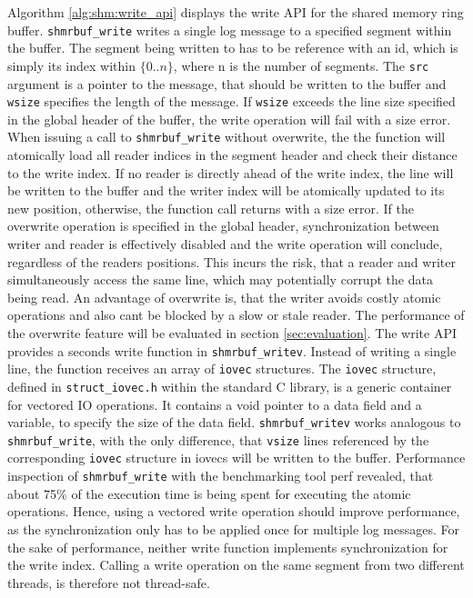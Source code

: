 Algorithm \ref{alg:shm:write_api} displays the write API for the shared memory ring buffer. \texttt{shmrbuf\_write}
writes a single log message to a specified segment within the buffer. The segment being written to has to be reference with an id, which is simply its index within $\{0..n\}$, where
n is the number of segments. The \texttt{src} argument is a pointer to the message, that should be written to the buffer and \texttt{wsize} specifies the length of the message.
If \texttt{wsize} exceeds the line size specified in the global header of the buffer, the write operation will fail with a size error. When issuing a call to \texttt{shmrbuf\_write} without overwrite, the 
the function will atomically load all reader indices in the segment header and check their distance to the write index. If no reader is directly ahead of the write index, the line will be written
to the buffer and the writer index will be atomically updated to its new position, otherwise, the function call returns with a size error. If the overwrite operation is specified in the global header, synchronization between writer and reader is
effectively disabled and the write operation will conclude, regardless of the readers positions. This incurs the risk, that a reader and writer simultaneously access 
the same line, which may potentially corrupt the data being read. An advantage of overwrite is, that the writer avoids costly atomic operations and also cant be blocked 
by a slow or stale reader. The performance of the overwrite feature will be evaluated in section \ref{sec:evaluation}.
The write API provides a seconds write function in \texttt{shmrbuf\_writev}. Instead of writing a single line, the function receives an  
 array of \texttt{iovec} structures. The \texttt{iovec} structure, defined in \texttt{struct\_iovec.h} within the standard C library, is a generic container for vectored
\ac{IO} operations. It contains a void pointer to a data field and a variable, to specify the size of the data field. 
\texttt{shmrbuf\_writev} works analogous to \texttt{shmrbuf\_write}, with the only difference, that \texttt{vsize} lines referenced by the corresponding \texttt{iovec}
structure in iovecs will be written to the buffer. Performance inspection of \texttt{shmrbuf\_write} with the benchmarking tool
perf \cite{perf} revealed, that about 75\% of the execution time is being spent for executing the atomic operations. Hence, 
using a vectored write operation should improve performance, as the synchronization only has to be applied once for multiple log messages.
For the sake of performance, neither write function implements synchronization for the write index. Calling a write operation
on the same segment from two different threads, is therefore not thread-safe.

